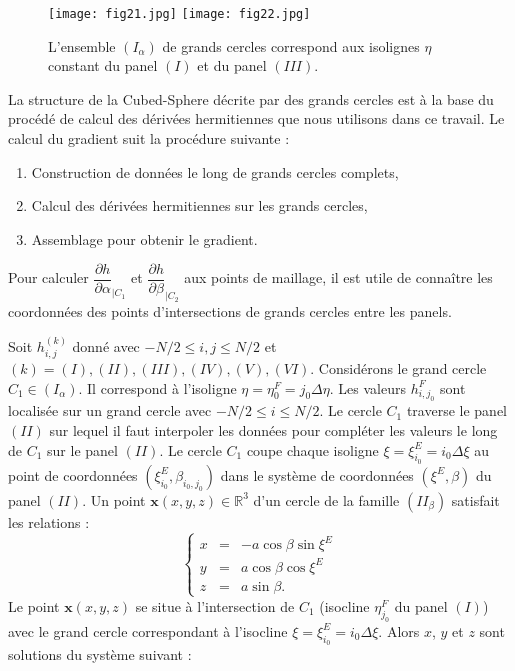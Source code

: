\begin{figure}
\begin{center}
\texttt{[image: fig21.jpg]}
\texttt{[image: fig22.jpg]}
\end{center}
\caption{L'ensemble $(I_{\alpha})$ de grands cercles correspond aux isolignes $\eta$ constant du panel $(I)$ et du panel $(III)$.}
\end{figure}


La structure de la Cubed-Sphere décrite par des grands cercles est à la base du procédé de calcul des dérivées hermitiennes que nous utilisons dans ce travail. Le calcul du gradient suit la procédure suivante :
\begin{enumerate}
\item Construction de données le long de grands cercles complets,
\item Calcul des dérivées hermitiennes sur les grands cercles,
\item Assemblage pour obtenir le gradient.
\end{enumerate}

Pour calculer $\dfrac{\partial h}{\partial \alpha}_{|C_1}$ et $\dfrac{\partial h}{\partial \beta}_{|C_2}$ aux points de maillage, il est utile de connaître les coordonnées des points d'intersections de grands cercles entre les panels.

Soit $h_{i,j}^{(k)}$ donné avec $-N/2 \leq i,j \leq N/2$ et $(k) = (I), (II), (III), (IV), (V), (VI)$. Considérons le grand cercle $C_1 \in (I_{\alpha})$. Il correspond à l'isoligne $\eta = \eta_0^F = j_0 \Delta \eta$. Les valeurs $h_{i,j_0}^F$ sont localisée sur un grand cercle avec $-N/2 \leq i \leq N/2$. Le cercle $C_1$ traverse le panel $(II)$ sur lequel il faut interpoler les données pour compléter les valeurs le long de $C_1$ sur le panel $(II)$. Le cercle $C_1$ coupe chaque isoligne $\xi = \xi^E_{i_0} = i_0 \Delta \xi$ au point de coordonnées $(\xi_{i_0}^E, \beta_{i_0,j_0})$ dans le système de coordonnées $(\xi^E, \beta)$ du panel $(II)$. Un point $\mathbf{x}(x,y,z)\in \mathbb{R}^3$ d'un cercle de la famille $(II_{\beta})$ satisfait les relations :
\begin{equation}
\left\lbrace
\begin{array}{rcl}
x & = & - a \cos \beta \sin \xi^E \\
y & = & a \cos \beta \cos \xi^E \\
z & = & a \sin \beta.
\end{array}
\right.
\end{equation}
Le point $\mathbf{x}(x,y,z)$ se situe à l'intersection de $C_1$ (isocline $\eta^F_{j_0}$ du panel $(I)$) avec le grand cercle correspondant à l'isocline $\xi = \xi^E_{i_0} = i_0 \Delta \xi$. Alors $x$, $y$ et $z$ sont solutions du système suivant :

